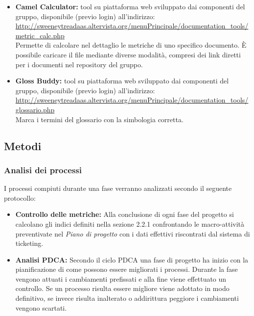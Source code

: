 \documentclass[a4paper]{article}
\begin{document}
\begin{itemize}
				\item \textbf{Camel Calculator:} tool su piattaforma web sviluppato dai componenti del gruppo,
				disponibile (previo login) all'indirizzo: \\
				\url{http://sweeneytreadaas.altervista.org/menuPrincipale/documentation_tools/metric_calc.php} \\
				Permette di calcolare nel dettaglio le metriche di uno specifico documento. È possibile caricare
				il file mediante diverse modalità, compresi dei link diretti per i documenti nel repository del gruppo.
				
				\item \textbf{Gloss Buddy:} tool su piattaforma web sviluppato dai componenti del gruppo,
				disponibile (previo login) all'indirizzo: \\
				\url{http://sweeneytreadaas.altervista.org/menuPrincipale/documentation_tools/glossario.php} \\
				Marca i termini del glossario con la simbologia corretta.
				
			\end{itemize}
		\subsection{Metodi}
			
			\subsubsection{Analisi dei processi}
				I processi compiuti durante una fase verranno analizzati secondo il seguente protocollo:
				\begin{itemize}
					\item \textbf{Controllo delle metriche:}
						Alla conclusione di ogni fase del progetto si calcolano gli indici definiti nella sezione 2.2.1 confrontando 
						le macro-attività preventivate nel \emph{Piano di progetto} con i dati effettivi riscontrati dal sistema di ticketing.
					\item \textbf{Analisi PDCA:}
						Secondo il ciclo PDCA una fase di progetto ha inizio con la pianificazione di come possono essere migliorati i processi. 
						Durante la fase vengono attuati i cambiamenti prefissati e alla fine viene effettuato un controllo. Se un processo 
						risulta essere migliore viene adottato in modo definitivo, se invece risulta inalterato o addirittura peggiore i 
						cambiamenti vengono scartati.
				\end{itemize}
\end{document}
